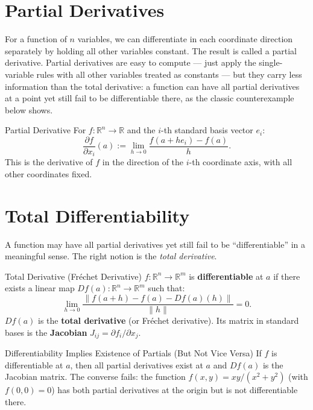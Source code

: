 \documentclass[12pt, openany]{book}
\theoremstyle{plain}
\theoremstyle{definition}
\theoremstyle{remark}
\newcommand{\R}{\mathbb{R}}
\begin{document}
\section{Partial Derivatives}

For a function of $n$ variables, we can differentiate in each coordinate direction separately by holding all other variables constant.  The result is called a partial derivative.  Partial derivatives are easy to compute --- just apply the single-variable rules with all other variables treated as constants --- but they carry less information than the total derivative: a function can have all partial derivatives at a point yet still fail to be differentiable there, as the classic counterexample below shows.

\begin{defbox}{Partial Derivative}
For $f : \R^n \to \R$ and the $i$-th standard basis vector $e_i$:
\[ \frac{\partial f}{\partial x_i}(a) := \lim_{h \to 0} \frac{f(a + he_i) - f(a)}{h}. \]
This is the derivative of $f$ in the direction of the $i$-th coordinate axis, with all other coordinates fixed.
\end{defbox}
\color{black}

\section{Total Differentiability}

A function may have all partial derivatives yet still fail to be ``differentiable'' in a meaningful sense. The right notion is the \emph{total derivative}.

\begin{defbox}{Total Derivative (Fr\'echet Derivative)}
$f : \R^n \to \R^m$ is \textbf{differentiable} at $a$ if there exists a linear map $Df(a) : \R^n \to \R^m$ such that:
\[ \lim_{h \to 0} \frac{\|f(a+h) - f(a) - Df(a)(h)\|}{\|h\|} = 0. \]
$Df(a)$ is the \textbf{total derivative} (or Fr\'echet derivative). Its matrix in standard bases is the \textbf{Jacobian} $J_{ij} = \partial f_i/\partial x_j$.
\end{defbox}
\color{black}

\begin{thmbox}{Differentiability Implies Existence of Partials (But Not Vice Versa)}
If $f$ is differentiable at $a$, then all partial derivatives exist at $a$ and $Df(a)$ is the Jacobian matrix.
The converse fails: the function $f(x,y) = xy/(x^2+y^2)$ (with $f(0,0)=0$) has both partial derivatives at the origin but is not differentiable there.
\end{thmbox}
\color{black}
\end{document}
